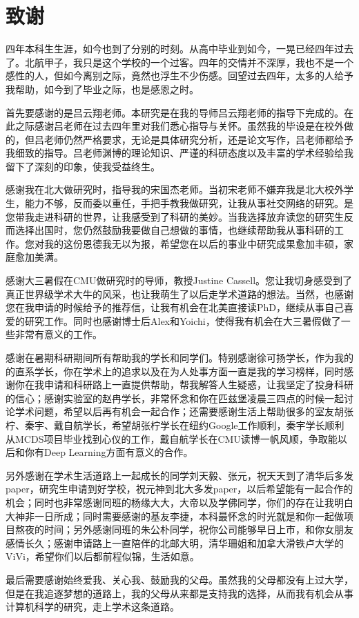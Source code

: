 \chapter*{致谢}

\qquad 四年本科生生涯，如今也到了分别的时刻。从高中毕业到如今，一晃已经四年过去了。北航甲子，我只是这个学校的一个过客。四年的交情并不深厚，我也不是一个感性的人，但如今离别之际，竟然也浮生不少伤感。回望过去四年，太多的人给予我帮助，如今到了毕业之际，也是感恩之时。

首先要感谢的是吕云翔老师。本研究是在我的导师吕云翔老师的指导下完成的。在此之际感谢吕老师在过去四年里对我们悉心指导与关怀。虽然我的毕设是在校外做的，但吕老师仍然严格要求，无论是具体研究分析，还是论文写作，吕老师都给予我细致的指导。吕老师渊博的理论知识、严谨的科研态度以及丰富的学术经验给我留下了深刻的印象，使我受益终生。

感谢我在北大做研究时，指导我的宋国杰老师。当初宋老师不嫌弃我是北大校外学生，能力不够，反而委以重任，手把手教我做研究，让我从事社交网络的研究。是您带我走进科研的世界，让我感受到了科研的美妙。当我选择放弃读您的研究生反而选择出国时，您仍然鼓励我要做自己想做的事情，也继续帮助我从事科研的工作。您对我的这份恩德我无以为报，希望您在以后的事业中研究成果愈加丰硕，家庭愈加美满。

感谢大三暑假在CMU做研究时的导师，教授Justine Cassell。您让我切身感受到了真正世界级学术大牛的风采，也让我萌生了以后走学术道路的想法。当然，也感谢您在我申请的时候给予的推荐信，让我有机会在北美直接读PhD，继续从事自己喜爱的研究工作。同时也感谢博士后Alex和Yoichi，使得我有机会在大三暑假做了一些非常有意义的工作。

感谢在暑期科研期间所有帮助我的学长和同学们。特别感谢徐可扬学长，作为我的的直系学长，你在学术上的追求以及在为人处事方面一直是我的学习榜样，同时感谢你在我申请和科研路上一直提供帮助，帮我解答人生疑惑，让我坚定了投身科研的信心；感谢实验室的赵冉学长，非常怀念和你在匹兹堡凌晨三四点的时候一起讨论学术问题，希望以后再有机会一起合作；还需要感谢生活上帮助很多的室友胡张柠、秦宇、戴自航学长，希望胡张柠学长在纽约Google工作顺利，秦宇学长顺利从MCDS项目毕业找到心仪的工作，戴自航学长在CMU读博一帆风顺，争取能以后和你有Deep Learning方面有意义的合作。


另外感谢在学术生活道路上一起成长的同学刘天毅、张元，祝天天到了清华后多发paper，研究生申请到好学校，祝元神到北大多发paper，以后希望能有一起合作的机会；同时也非常感谢同班的杨缘大大，大帝以及学佛同学，你们的存在让我明白大神非一日所成；同时需要感谢的基友李捷，本科最怀念的时光就是和你一起做项目熬夜的时间；另外感谢同班的朱公朴同学，祝你公司能够早日上市，和你女朋友感情长久；感谢申请路上一直陪伴的北邮大明，清华珊姐和加拿大滑铁卢大学的ViVi，希望你们以后都前程似锦，生活如意。


最后需要感谢始终爱我、关心我、鼓励我的父母。虽然我的父母都没有上过大学，但是在我追逐梦想的道路上，我的父母从来都是支持我的选择，从而我有机会从事计算机科学的研究，走上学术这条道路。


















\cleardoublepage
